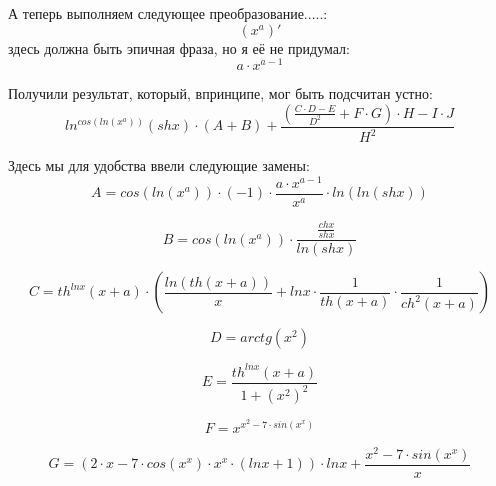 \documentclass[a4paper, 12pt]{article}
\begin{document}
А теперь выполняем следующее преобразование.....:
\begin{equation}
\left(x^{a} \right)'
\end{equation}
здесь должна быть эпичная фраза, но я её не придумал:
\begin{equation}
a\cdot x ^{a - 1}
\end{equation}

Получили результат, который, впринципе, мог быть подсчитан устно:
\begin{equation}
\boxed{ln^{cos\left(ln\left(x^{a}\right)\right)}\left(shx\right) \cdot \left(A + B\right) + \frac{\left(\frac{C \cdot D - E}{D^{2}} + F \cdot G\right) \cdot H - I \cdot J}{H^{2}}}
\end{equation}

Здесь мы для удобства ввели следующие замены:
\begin{equation}
	A = cos\left(ln\left(x^{a}\right)\right) \cdot \left(-1\right) \cdot \frac{a \cdot x^{a - 1}}{x^{a}} \cdot ln\left(ln\left(shx\right)\right)
\end{equation}

\begin{equation}
	B = cos\left(ln\left(x^{a}\right)\right) \cdot \frac{\frac{chx}{shx}}{ln\left(shx\right)}
\end{equation}

\begin{equation}
	C = th^{lnx}\left(x + a\right) \cdot \left(\frac{ln\left(th\left(x + a\right)\right)}{x} + lnx \cdot \frac{1}{th\left(x + a\right)} \cdot \frac{1}{ch^{2}\left(x + a\right)}\right)
\end{equation}

\begin{equation}
	D = arctg\left(x^{2}\right)
\end{equation}

\begin{equation}
	E = \frac{th^{lnx}\left(x + a\right)}{1 + \left(x^{2}\right)^{2}}
\end{equation}

\begin{equation}
	F = x^{x^{2} - 7 \cdot sin\left(x^{x}\right)}
\end{equation}

\begin{equation}
	G = \left(2 \cdot x - 7 \cdot cos\left(x^{x}\right) \cdot x^{x} \cdot \left(lnx + 1\right)\right) \cdot lnx + \frac{x^{2} - 7 \cdot sin\left(x^{x}\right)}{x}
\end{equation}
\end{document}
